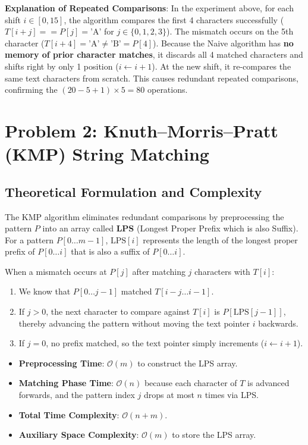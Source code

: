 \documentclass[12pt]{article}
\begin{document}
\textbf{Explanation of Repeated Comparisons}:
In the experiment above, for each shift $i \in [0, 15]$, the algorithm compares the first 4 characters successfully ($T[i+j] == P[j] = \text{'A'}$ for $j \in \{0, 1, 2, 3\}$). The mismatch occurs on the 5th character ($T[i+4] = \text{'A'} \neq \text{'B'} = P[4]$).
Because the Naive algorithm has \textbf{no memory of prior character matches}, it discards all 4 matched characters and shifts right by only 1 position ($i \leftarrow i + 1$). At the new shift, it re-compares the same text characters from scratch. This causes redundant repeated comparisons, confirming the $(20 - 5 + 1) \times 5 = 80$ operations.

\section{Problem 2: Knuth--Morris--Pratt (KMP) String Matching}

\subsection{Theoretical Formulation and Complexity}
The KMP algorithm eliminates redundant comparisons by preprocessing the pattern $P$ into an array called \textbf{LPS} (Longest Proper Prefix which is also Suffix).
For a pattern $P[0 \dots m-1]$, $\text{LPS}[i]$ represents the length of the longest proper prefix of $P[0 \dots i]$ that is also a suffix of $P[0 \dots i]$.

When a mismatch occurs at $P[j]$ after matching $j$ characters with $T[i]$:
\begin{enumerate}
    \item We know that $P[0 \dots j-1]$ matched $T[i-j \dots i-1]$.
    \item If $j > 0$, the next character to compare against $T[i]$ is $P[\text{LPS}[j-1]]$, thereby advancing the pattern without moving the text pointer $i$ backwards.
    \item If $j = 0$, no prefix matched, so the text pointer simply increments ($i \leftarrow i + 1$).
\end{enumerate}

\begin{itemize}
    \item \textbf{Preprocessing Time}: $\mathcal{O}(m)$ to construct the LPS array.
    \item \textbf{Matching Phase Time}: $\mathcal{O}(n)$ because each character of $T$ is advanced forwards, and the pattern index $j$ drops at most $n$ times via LPS.
    \item \textbf{Total Time Complexity}: $\mathcal{O}(n + m)$.
    \item \textbf{Auxiliary Space Complexity}: $\mathcal{O}(m)$ to store the LPS array.
\end{itemize}
\end{document}
